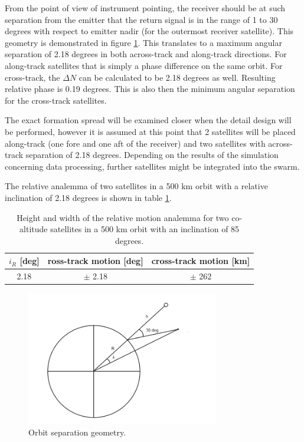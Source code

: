 From the point of view of instrument pointing, the receiver should be at such separation from the emitter that the return signal is in the range of 1 to 30 degrees with respect to emitter nadir (for the outermost receiver satellite). This geometry is demonstrated in figure \ref{fig:separation}. This translates to a maximum angular separation of 2.18 degrees in both across-track and along-track directions. For along-track satellites that is simply a phase difference on the same orbit. For cross-track, the $\Delta N$ can be calculated to be 2.18 degrees as well. Resulting relative phase is 0.19 degrees. This is also then the minimum angular separation for the cross-track satellites.

The exact formation spread will be examined closer when the detail design will be performed, however it is assumed at this point that 2 satellites will be placed along-track (one fore and one aft of the receiver) and two satellites with across-track separation of 2.18 degrees. Depending on the results of the simulation concerning data processing, further satellites might be integrated into the swarm.

The relative analemma of two satellites in a 500 km orbit with a relative inclination of 2.18 degrees is shown in table \ref{table:analemma}.

\begin{table}[ht]
	\centering
		\begin{tabular}{c |c | c }
		 $i_R$ [deg] & ross-track motion [deg] & cross-track motion [km] \\ \hline \hline
		 2.18 & $\pm$ 2.18 & $\pm$ 262 
		\end{tabular}
	\caption{Height and width of the relative motion analemma for two co-altitude satellites in a 500 km orbit with an inclination of 85 degrees.}
	\label{table:analemma}
\end{table}

\begin{figure}[!ht]
\centering
\includegraphics[width=0.75\textwidth, angle=0]{chapters/img/seperation.png}
\caption{Orbit separation geometry.}
\label{fig:separation}
\end{figure}

